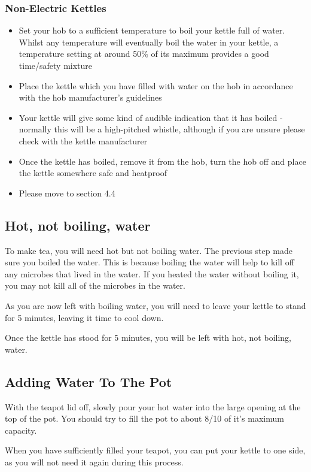 \documentclass{article}
\begin{document}
\subsubsection{Non-Electric Kettles}
\begin{itemize}
\item Set your hob to a sufficient temperature to boil your kettle full of water. Whilst any temperature will eventually boil the water in your kettle, a temperature setting at around 50\% of its maximum provides a good time/safety mixture
\item Place the kettle which you have filled with water on the hob in accordance with the hob manufacturer's guidelines
\item Your kettle will give some kind of audible indication that it has boiled - normally this will be a high-pitched whistle, although if you are unsure please check with the kettle manufacturer
\item Once the kettle has boiled, remove it from the hob, turn the hob off and place the kettle somewhere safe and heatproof
\item Please move to section 4.4 
\end{itemize}
\subsection{Hot, not boiling, water}
To make tea, you will need hot but not boiling water. The previous step made sure you boiled the water. This is because boiling the water will help to kill off any microbes that lived in the water. If you heated the water without boiling it, you may not kill all of the microbes in the water.

As you are now left with boiling water, you will need to leave your kettle to stand for 5 minutes, leaving it time to cool down.

Once the kettle has stood for 5 minutes, you will be left with hot, not boiling, water.

\subsection{Adding Water To The Pot}
With the teapot lid off, slowly pour your hot water into the large opening at the top of the pot. You should try to fill the pot to about 8/10 of it's maximum capacity.

When you have sufficiently filled your teapot, you can put your kettle to one side, as you will not need it again during this process.
\end{document}
